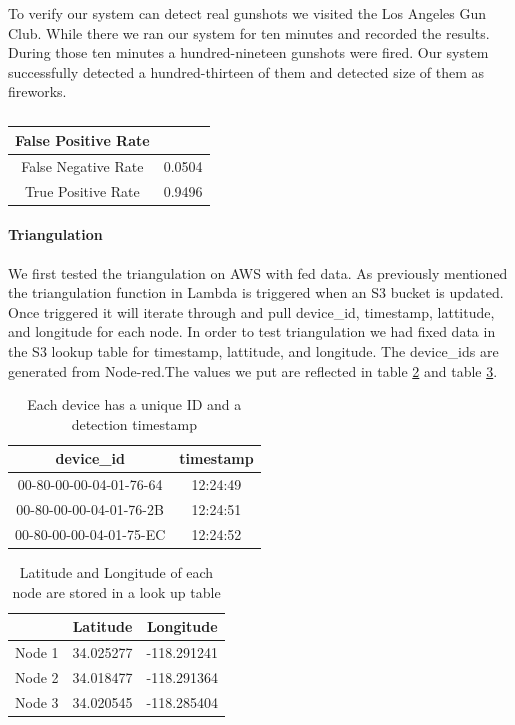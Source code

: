 \documentclass[conference]{IEEEtran}
\begin{document}
To verify our system can detect real gunshots we visited the Los Angeles Gun Club. While there we ran our system for ten minutes and recorded the results. During those ten minutes a hundred-nineteen gunshots were fired. Our system successfully detected a hundred-thirteen of them and detected size of them as fireworks.


\begin{table}[htbp]
\caption{}
\begin{center}
 \begin{tabular}{||c || c||} 
 \hline
False Positive Rate &  \\ 
 \hline
False Negative Rate & 0.0504\\
 \hline
True Positive Rate &0.9496\\
 \hline
\end{tabular}
\label{tab1}
\end{center}
\end{table}

\paragraph{Triangulation}
We first tested the triangulation on AWS with fed data. As previously mentioned the triangulation function in Lambda is triggered when an S3 bucket is updated. Once triggered it will iterate through and pull device\_id, timestamp, lattitude, and longitude for each node. In order to test triangulation we had fixed data in the S3 lookup table for timestamp, lattitude, and longitude. The device\_ids are generated from Node-red.The values we put are reflected in table  \ref{tab1} and table  \ref{tab2}.



\begin{table}[htbp]
\caption{Each device has a unique ID and a detection timestamp }
\begin{center}
 \begin{tabular}{||c | c||} 
 \hline
device\_id & timestamp \\ [0.5ex] 
 \hline\hline
 00-80-00-00-04-01-76-64 & 12:24:49 \\ 
 \hline
 00-80-00-00-04-01-76-2B & 12:24:51 \\
 \hline
 00-80-00-00-04-01-75-EC & 12:24:52\\
 \hline
\end{tabular}
\label{tab1}
\end{center}
\end{table}
\begin{table}[htbp]
\caption{Latitude and Longitude of each node are stored in a look up table }
\begin{center}
 \begin{tabular}{||c |c  c||} 
 \hline
&Latitude & Longitude \\ [0.5ex] 
 \hline\hline
Node 1 & 34.025277 & -118.291241 \\ 
 \hline
Node 2 & 34.018477 & -118.291364\\
 \hline
Node 3 & 34.020545 & -118.285404\\
 \hline
\end{tabular}
\label{tab2}
\end{center}
\end{table}
\end{document}
